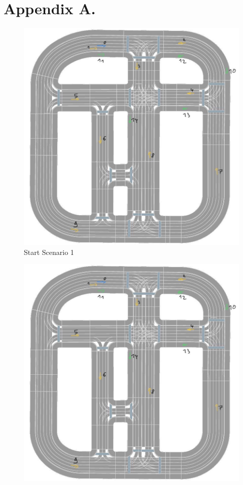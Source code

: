 \chapter{Appendix A.}
\label{Appendix:A}

\begin{figure}[ht] 
	\centering
	\begin{minipage}[b]{0.43\linewidth}
		\centering
		\includegraphics[width=1\linewidth]{figures/start_scenarios/scenario_v3} 
		Start Scenario 1
	\end{minipage}%
	\begin{minipage}[b]{0.43\linewidth}
		\centering
		\includegraphics[width=1\linewidth]{figures/start_scenarios/scenario_v3} 

\end{minipage}
\end{figure}
